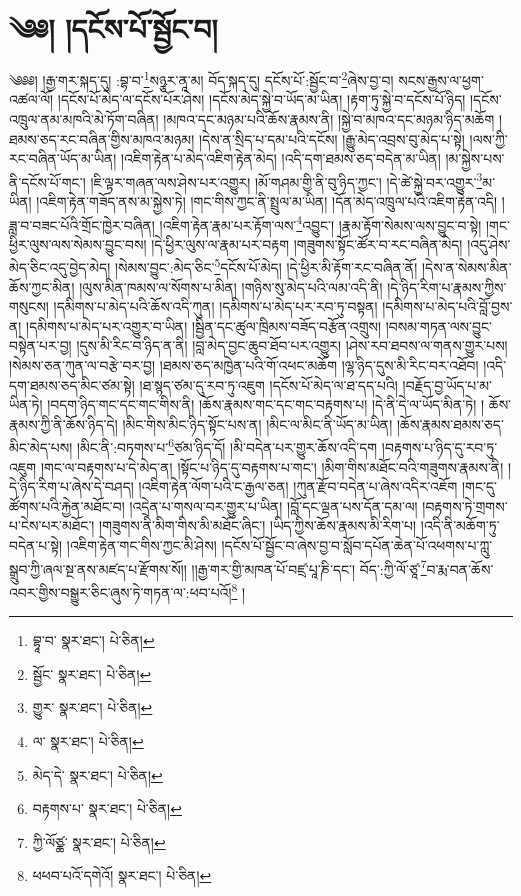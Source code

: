\setcounter{footnote}{0} 
\chapter{༄༅། །དངོས་པོ་སྦྱོང་བ།}༄༅༅། །རྒྱ་གར་སྐད་དུ། :བྷ་བ་\footnote{བྷཱ་བ་  སྣར་ཐང་།  པེ་ཅིན། }སཉྩར་ནཱ་མ། བོད་སྐད་དུ། དངོས་པོ་:སྦྱོང་བ་\footnote{སྦྱོང་  སྣར་ཐང་།  པེ་ཅིན། }ཞེས་བྱ་བ། སངས་རྒྱས་ལ་ཕྱག་འཚལ་ལོ། །དངོས་པོ་མེད་ལ་དངོས་པོར་ཤེས། །དངོས་མེད་སྐྱེ་བ་ཡོད་མ་ཡིན། །རྟག་ཏུ་སྐྱེ་བ་དངོས་པོ་ཉིད། །དངོས་འཁྲུལ་ནམ་མཁའི་མེ་ཏོག་བཞིན། །མཁའ་དང་མཉམ་པའི་ཆོས་རྣམས་ནི། །སྐྱེ་བ་མཁའ་དང་མཉམ་ཉིད་མཆོག །ཐམས་ཅད་རང་བཞིན་གྱིས་མཁའ་མཉམ། །དེས་ན་སྲིད་པ་དམ་པའི་དངོས། །རྒྱུ་མེད་འབྲས་བུ་མེད་པ་སྟེ། །ལས་ཀྱི་རང་བཞིན་ཡོད་མ་ཡིན། །འཇིག་རྟེན་པ་མེད་འཇིག་རྟེན་མེད། །འདི་དག་ཐམས་ཅད་བདེན་མ་ཡིན། །མ་སྐྱེས་པས་ནི་དངོས་པོ་གང་། །ཇི་ལྟར་གཞན་ལས་ཤེས་པར་འགྱུར། །མོ་གཤམ་གྱི་ནི་བུ་ཉིད་ཀྱང་། །དེ་ཚེ་སྐྱེ་བར་འགྱུར་\footnote{གྱུར་  སྣར་ཐང་།  པེ་ཅིན། }མ་ཡིན། །འཇིག་རྟེན་གཟོད་ནས་མ་སྐྱེས་ཏེ། །གང་གིས་ཀྱང་ནི་སྤྲུལ་མ་ཡིན། །དོན་མེད་འཁྲུལ་པའི་འཇིག་རྟེན་འདི། །ཟླ་བ་བཟང་པོའི་གྲོང་ཁྱེར་བཞིན། །འཇིག་རྟེན་རྣམ་པར་རྟོག་ལས་\footnote{ལ་  སྣར་ཐང་།  པེ་ཅིན། }འབྱུང་། །རྣམ་རྟོག་སེམས་ལས་བྱུང་བ་སྟེ། །གང་ཕྱིར་ལུས་ལས་སེམས་བྱུང་བས། །དེ་ཕྱིར་ལུས་ལ་རྣམ་པར་བརྟག །གཟུགས་སྟོང་ཚོར་བ་རང་བཞིན་མེད། །འདུ་ཤེས་མེད་ཅིང་འདུ་བྱེད་མེད། །སེམས་བྱུང་:མེད་ཅིང་\footnote{མེད་དེ་  སྣར་ཐང་།  པེ་ཅིན། }དངོས་པོ་མེད། །དེ་ཕྱིར་མི་རྟོག་རང་བཞིན་ནོ། །དེས་ན་སེམས་མིན་ཆོས་ཀྱང་མིན། །ལུས་མིན་ཁམས་ལ་སོགས་པ་མིན། །གཉིས་སུ་མེད་པའི་ལམ་འདི་ནི། །དེ་ཉིད་རིག་པ་རྣམས་ཀྱིས་གསུངས། །དམིགས་པ་མེད་པའི་ཆོས་འདི་ཀུན། །དམིགས་པ་མེད་པར་རབ་ཏུ་བསྟན། །དམིགས་པ་མེད་པའི་བློ་བྱས་ན། །དམིགས་པ་མེད་པར་འགྱུར་བ་ཡིན། །སྦྱིན་དང་ཚུལ་ཁྲིམས་བཟོད་བརྩོན་འགྲུས། །བསམ་གཏན་ལས་བྱུང་བསྟེན་པར་བྱ། །དུས་མི་རིང་བ་ཉིད་ན་ནི། །བླ་མེད་བྱང་ཆུབ་ཐོབ་པར་འགྱུར། །ཤེས་རབ་ཐབས་ལ་གནས་གྱུར་པས། །སེམས་ཅན་ཀུན་ལ་བརྩེ་བར་བྱ། །ཐམས་ཅད་མཁྱེན་པའི་གོ་འཕང་མཆོག །ལྷ་ཉིད་དུས་མི་རིང་བར་འཐོབ། །འདི་དག་ཐམས་ཅད་མིང་ཙམ་སྟེ། །ཐ་སྙད་ཙམ་དུ་རབ་ཏུ་འཇུག །དངོས་པོ་མེད་ལ་ཐ་དད་པའི། །བརྗོད་བྱ་ཡོད་པ་མ་ཡིན་ཏེ། །བདག་ཉིད་གང་དང་གང་གིས་ནི། །ཆོས་རྣམས་གང་དང་གང་བརྟགས་པ། །དེ་ནི་དེ་ལ་ཡོད་མིན་ཏེ། །
ཆོས་རྣམས་ཀྱི་ནི་ཆོས་ཉིད་དེ། །མིང་གིས་མིང་ཉིད་སྟོང་པས་ན། །མིང་ལ་མིང་ནི་ཡོད་མ་ཡིན། །ཆོས་རྣམས་ཐམས་ཅད་མིང་མེད་པས། །མིང་ནི་:བཏགས་པ་\footnote{བརྟགས་པ་  སྣར་ཐང་།  པེ་ཅིན། }ཙམ་ཉིད་དོ། །མི་བདེན་པར་གྱུར་ཆོས་འདི་དག །བརྟགས་པ་ཉིད་དུ་རབ་ཏུ་འཇུག །གང་ལ་བརྟགས་པ་དེ་མེད་ན། །སྟོང་པ་ཉིད་དུ་བརྟགས་པ་གང་། །མིག་གིས་མཐོང་བའི་གཟུགས་རྣམས་ནི། །དེ་ཉིད་རིག་པ་ཞེས་དེ་བཤད། །འཇིག་རྟེན་ལོག་པའི་ང་རྒྱལ་ཅན། །ཀུན་རྫོབ་བདེན་པ་ཞེས་འདིར་འཇོག །གང་དུ་ཚོགས་པའི་རྐྱེན་མཐོང་བ། །འདྲེན་པ་གསལ་བར་གྱུར་པ་ཡིན། །བློ་དང་ལྡན་པས་དོན་དམ་ལ། །བརྟགས་ཏེ་གྲགས་པ་ངེས་པར་མཐོང་། །གཟུགས་ནི་མིག་གིས་མི་མཐོང་ཞིང་། །ཡིད་ཀྱིས་ཆོས་རྣམས་མི་རིག་པ། །འདི་ནི་མཆོག་ཏུ་བདེན་པ་སྟེ། །འཇིག་རྟེན་གང་གིས་ཀྱང་མི་ཤེས། །དངོས་པོ་སྦྱོང་བ་ཞེས་བྱ་བ་སློབ་དཔོན་ཆེན་པོ་འཕགས་པ་ཀླུ་སྒྲུབ་ཀྱི་ཞལ་སྔ་ནས་མཛད་པ་རྫོགས་སོ།། །།རྒྱ་གར་གྱི་མཁན་པོ་བཛྲ་པཱ་ཎི་དང་། བོད་:ཀྱི་ལོ་ཙཱ་\footnote{ཀྱི་ལོཙྪ་  སྣར་ཐང་།  པེ་ཅིན། }བ་རྨ་བན་ཆོས་འབར་གྱིས་བསྒྱུར་ཅིང་ཞུས་ཏེ་གཏན་ལ་:ཕབ་པའོ།\footnote{ཕཕབ་པའོ་དགེའོ།  སྣར་ཐང་།  པེ་ཅིན། } ། 